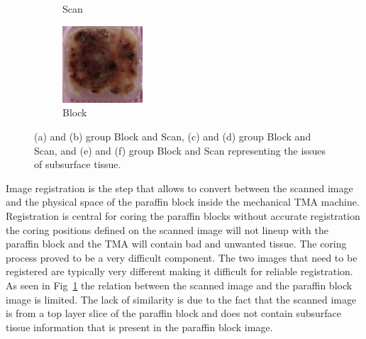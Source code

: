 \documentclass[a4paper,10pt,oneside]{article}
\begin{document}
\begin{figure}[hbtp]
\begin{subfigure}[b]{.2\textwidth}
    \caption{Scan}
  \end{subfigure}
  \begin{subfigure}[b]{.2\textwidth}
	  \includegraphics[width=3cm]{images/PO14004821_B3.JPG} 
    \caption{Block}
  \end{subfigure}
	\caption{(a) and (b) group Block and Scan, (c) and (d) group Block and Scan, and (e) and (f) group Block and Scan representing the issues of subsurface tissue.}
	\label{fig:subsurface}
\end{figure}
Image registration is the step that allows to convert between the scanned image and the physical space of the paraffin block inside the mechanical TMA machine. Registration is central for coring the paraffin blocks without accurate registration the coring positions defined on the scanned image will not lineup with the paraffin block and the TMA will contain bad and unwanted tissue. The coring process proved to be a very difficult component. The two images that need to be registered are typically very different making it difficult for reliable registration. As seen in Fig~\ref{fig:subsurface} the relation between the scanned image and the paraffin block image is limited. The lack of similarity is due to the fact that the scanned image is from a top layer slice of the paraffin block and does not contain subsurface tissue information that is present in the paraffin block image.
\end{document}
